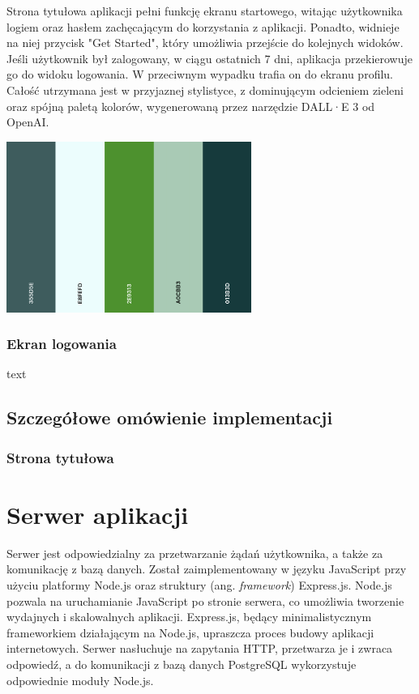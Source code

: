 Strona tytułowa aplikacji pełni funkcję ekranu startowego, witając użytkownika logiem oraz hasłem zachęcającym do korzystania z aplikacji. Ponadto, widnieje  na niej przycisk "Get Started", który umożliwia przejście do kolejnych widoków. Jeśli użytkownik był zalogowany, w ciągu ostatnich 7 dni, aplikacja przekierowuje go do widoku logowania. W przeciwnym wypadku trafia on do ekranu profilu. Całość utrzymana jest w przyjaznej stylistyce, z dominującym odcieniem zieleni oraz spójną paletą kolorów, wygenerowaną przez narzędzie DALL·E 3 od OpenAI.

\begin{center}
\includegraphics[width=0.6\textwidth]{images/front/theme.png}
\end{center}

\subsubsection{Ekran logowania}

text

\subsection{Szczegółowe omówienie implementacji}

\subsubsection{Strona tytułowa}


\section{Serwer aplikacji}
Serwer jest odpowiedzialny za przetwarzanie żądań użytkownika, a także za komunikację z bazą danych. Został zaimplementowany w języku JavaScript przy użyciu platformy Node.js oraz struktury (ang. \textit{framework}) Express.js. Node.js pozwala na uruchamianie JavaScript po stronie serwera, co umożliwia tworzenie wydajnych i skalowalnych aplikacji. Express.js, będący minimalistycznym frameworkiem działającym na Node.js, upraszcza proces budowy aplikacji internetowych. Serwer nasłuchuje na zapytania HTTP, przetwarza je i zwraca odpowiedź, a do komunikacji z bazą danych PostgreSQL wykorzystuje odpowiednie moduły Node.js.


